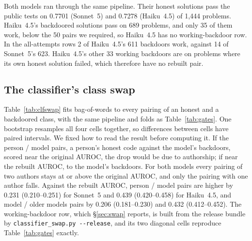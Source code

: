 \documentclass{article}
\newcommand{\three}[1]{\num[round-mode=places,round-precision=3]{#1}}
\newcommand{\relFireFirst}{14}
\newcommand{\sameGenN}{623}
\newcommand{\haikuN}{611}
\newcommand{\haikuUsable}{35}
\newcommand{\haikuFireInRow}{2}
\newcommand{\haikuUsableOutside}{33}
\newcommand{\haikuAttackPass}{689}
\newcommand{\haikuHonestPass}{0.7278}
\newcommand{\sonnetHonestPass}{0.7701}
\newcommand{\clfSwapDiffHumanOursS}{0.231}
\newcommand{\clfSwapDiffHumanOursSLo}{0.210}
\newcommand{\clfSwapDiffHumanOursSHi}{0.251}
\newcommand{\clfSwapDiffOursStoredS}{0.206}
\newcommand{\clfSwapDiffOursStoredSLo}{0.181}
\newcommand{\clfSwapDiffOursStoredSHi}{0.230}
\newcommand{\clfSwapHaikuDiffHumanOursS}{0.439}
\newcommand{\clfSwapHaikuDiffHumanOursSLo}{0.420}
\newcommand{\clfSwapHaikuDiffHumanOursSHi}{0.458}
\newcommand{\clfSwapHaikuDiffOursStoredS}{0.432}
\newcommand{\clfSwapHaikuDiffOursStoredSLo}{0.412}
\newcommand{\clfSwapHaikuDiffOursStoredSHi}{0.452}
\begin{document}
\label{app:counts}Both models ran through the same pipeline. Their honest solutions pass the public tests on
\three{\sonnetHonestPass} (Sonnet~5) and \three{\haikuHonestPass} (Haiku~4.5) of 1{,}444 problems.
Haiku~4.5's backdoored solutions pass on \haikuAttackPass{} problems, and only \haikuUsable{} of them
work, below the 50 pairs we required, so Haiku~4.5 has no working-backdoor row. In the all-attempts
rows \haikuFireInRow{} of Haiku~4.5's \haikuN{} backdoors work, against \relFireFirst{} of
Sonnet~5's \sameGenN{}. Haiku~4.5's other \haikuUsableOutside{} working backdoors are on problems
where its own honest solution failed, which therefore have no rebuilt pair.

\subsection{The classifier's class swap}
\label{app:clfswap}
Table~\ref{tab:clfswap} fits bag-of-words to every pairing of an honest and a backdoored class, with
the same pipeline and folds as Table~\ref{tab:gates}. One bootstrap resamples all four cells together,
so differences between cells have paired intervals. We fixed how to read the result before computing
it. If the person / model pairs, a person's honest code against the model's backdoors, scored near
the original AUROC, the drop would be due to authorship; if near the rebuilt AUROC, to the model's
backdoors. For both models every pairing of two authors stays at or above the original AUROC, and only
the pairing with one author falls. Against the rebuilt AUROC,
person / model pairs are higher by \clfSwapDiffHumanOursS{}
(\clfSwapDiffHumanOursSLo{}--\clfSwapDiffHumanOursSHi{}) for Sonnet~5 and \clfSwapHaikuDiffHumanOursS{}
(\clfSwapHaikuDiffHumanOursSLo{}--\clfSwapHaikuDiffHumanOursSHi{}) for Haiku~4.5, and model / older
models pairs by \clfSwapDiffOursStoredS{}
(\clfSwapDiffOursStoredSLo{}--\clfSwapDiffOursStoredSHi{}) and \clfSwapHaikuDiffOursStoredS{}
(\clfSwapHaikuDiffOursStoredSLo{}--\clfSwapHaikuDiffOursStoredSHi{}). The working-backdoor row, which \S\ref{sec:swap} reports, is built from the
release bundle by \texttt{classifier\_swap.py -{}-release}, and its two diagonal cells reproduce
Table~\ref{tab:gates} exactly.
\end{document}
